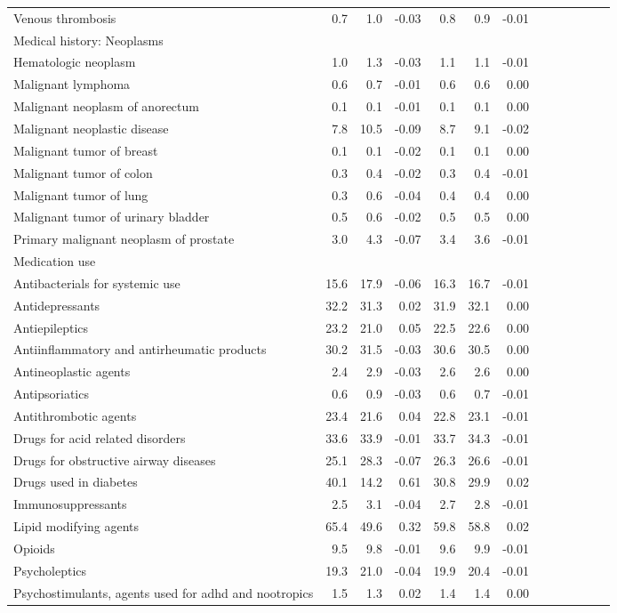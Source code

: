 \documentclass[11pt,]{article}
\begin{document}
\begin{longtable}{lrrrrrrrrrrrr}
      Venous thrombosis &  0.7 &  1.0 & -0.03 &  0.8 &  0.9 & -0.01 \\ 
  Medical history: Neoplasms &    &    &     &    &    &     \\ 
      Hematologic neoplasm &  1.0 &  1.3 & -0.03 &  1.1 &  1.1 & -0.01 \\ 
      Malignant lymphoma &  0.6 &  0.7 & -0.01 &  0.6 &  0.6 &  0.00 \\ 
      Malignant neoplasm of anorectum &  0.1 &  0.1 & -0.01 &  0.1 &  0.1 &  0.00 \\ 
      Malignant neoplastic disease &  7.8 & 10.5 & -0.09 &  8.7 &  9.1 & -0.02 \\ 
      Malignant tumor of breast &  0.1 &  0.1 & -0.02 &  0.1 &  0.1 &  0.00 \\ 
      Malignant tumor of colon &  0.3 &  0.4 & -0.02 &  0.3 &  0.4 & -0.01 \\ 
      Malignant tumor of lung &  0.3 &  0.6 & -0.04 &  0.4 &  0.4 &  0.00 \\ 
      Malignant tumor of urinary bladder &  0.5 &  0.6 & -0.02 &  0.5 &  0.5 &  0.00 \\ 
      Primary malignant neoplasm of prostate &  3.0 &  4.3 & -0.07 &  3.4 &  3.6 & -0.01 \\ 
  Medication use &    &    &     &    &    &     \\ 
      Antibacterials for systemic use & 15.6 & 17.9 & -0.06 & 16.3 & 16.7 & -0.01 \\ 
      Antidepressants & 32.2 & 31.3 &  0.02 & 31.9 & 32.1 &  0.00 \\ 
      Antiepileptics & 23.2 & 21.0 &  0.05 & 22.5 & 22.6 &  0.00 \\ 
      Antiinflammatory and antirheumatic products & 30.2 & 31.5 & -0.03 & 30.6 & 30.5 &  0.00 \\ 
      Antineoplastic agents &  2.4 &  2.9 & -0.03 &  2.6 &  2.6 &  0.00 \\ 
      Antipsoriatics &  0.6 &  0.9 & -0.03 &  0.6 &  0.7 & -0.01 \\ 
      Antithrombotic agents & 23.4 & 21.6 &  0.04 & 22.8 & 23.1 & -0.01 \\ 
      Drugs for acid related disorders & 33.6 & 33.9 & -0.01 & 33.7 & 34.3 & -0.01 \\ 
      Drugs for obstructive airway diseases & 25.1 & 28.3 & -0.07 & 26.3 & 26.6 & -0.01 \\ 
      Drugs used in diabetes & 40.1 & 14.2 &  0.61 & 30.8 & 29.9 &  0.02 \\ 
      Immunosuppressants &  2.5 &  3.1 & -0.04 &  2.7 &  2.8 & -0.01 \\ 
      Lipid modifying agents & 65.4 & 49.6 &  0.32 & 59.8 & 58.8 &  0.02 \\ 
      Opioids &  9.5 &  9.8 & -0.01 &  9.6 &  9.9 & -0.01 \\ 
      Psycholeptics & 19.3 & 21.0 & -0.04 & 19.9 & 20.4 & -0.01 \\ 
      Psychostimulants, agents used for adhd and nootropics &  1.5 &  1.3 &  0.02 &  1.4 &  1.4 &  0.00 \\ 
   \bottomrule\end{longtable}
\end{document}
